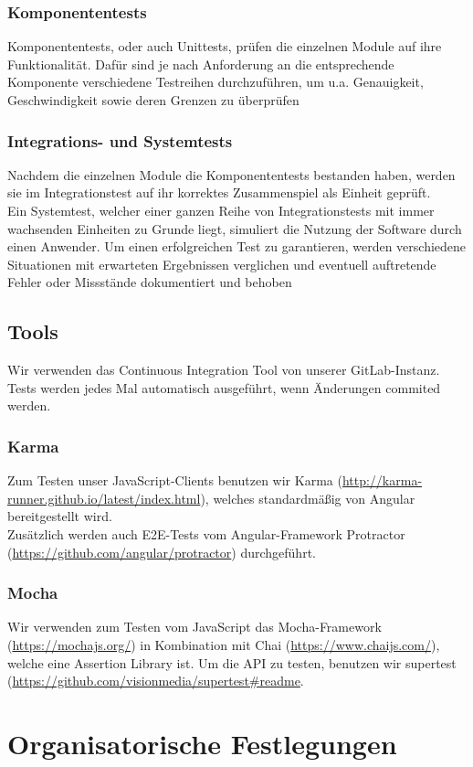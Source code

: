 \documentclass[11pt,a4paper]{report}
\begin{document}
\subsubsection{Komponententests}
Komponententests, oder auch Unittests, prüfen die einzelnen Module auf ihre Funktionalität. Dafür
sind je nach Anforderung an die entsprechende Komponente verschiedene Testreihen
durchzuführen, um u.a. Genauigkeit, Geschwindigkeit sowie deren Grenzen zu überprüfen
\subsubsection{Integrations- und Systemtests}
Nachdem die einzelnen Module die Komponententests bestanden haben, werden sie im Integrationstest auf ihr korrektes Zusammenspiel als Einheit geprüft.\\
Ein Systemtest, welcher einer ganzen Reihe von Integrationstests mit immer wachsenden Einheiten zu
Grunde liegt, simuliert die Nutzung der Software durch einen Anwender. Um einen erfolgreichen Test zu garantieren, werden verschiedene Situationen mit erwarteten
Ergebnissen verglichen und eventuell auftretende Fehler oder Missstände dokumentiert und behoben
\subsection{Tools}
Wir verwenden das Continuous Integration Tool von unserer GitLab-Instanz. Tests werden jedes Mal automatisch ausgeführt, wenn Änderungen commited werden.
\subsubsection{Karma}
Zum Testen unser JavaScript-Clients benutzen wir Karma (\url{http://karma-runner.github.io/latest/index.html}), welches standardmäßig von Angular bereitgestellt wird.\\
Zusätzlich werden auch E2E-Tests vom Angular-Framework Protractor (\url{https://github.com/angular/protractor}) durchgeführt.
\subsubsection{Mocha}
Wir verwenden zum Testen vom JavaScript das Mocha-Framework (\url{https://mochajs.org/}) in Kombination mit Chai (\url{https://www.chaijs.com/}), welche eine Assertion Library ist. Um die API zu testen, benutzen wir supertest (\url{https://github.com/visionmedia/supertest#readme}. 
\section{Organisatorische Festlegungen}
\end{document}

